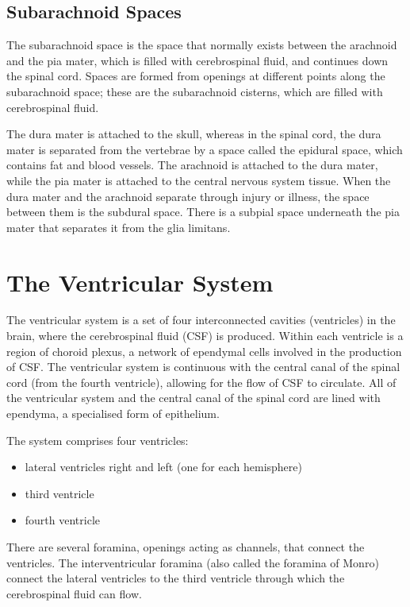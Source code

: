 \hypertarget{subarachnoid-spaces}{%
\subsection{Subarachnoid Spaces}\label{subarachnoid-spaces}}

The subarachnoid space is the space that normally exists between the arachnoid and the pia mater, which is filled with cerebrospinal fluid, and continues down the spinal cord. Spaces are formed from openings at different points along the subarachnoid space; these are the subarachnoid cisterns, which are filled with cerebrospinal fluid.

The dura mater is attached to the skull, whereas in the spinal cord, the dura mater is separated from the vertebrae by a space called the epidural space, which contains fat and blood vessels. The arachnoid is attached to the dura mater, while the pia mater is attached to the central nervous system tissue. When the dura mater and the arachnoid separate through injury or illness, the space between them is the subdural space. There is a subpial space underneath the pia mater that separates it from the glia limitans.

\hypertarget{the-ventricular-system}{%
\section{The Ventricular System}\label{the-ventricular-system}}

The ventricular system is a set of four interconnected cavities (ventricles) in the brain, where the cerebrospinal fluid (CSF) is produced. Within each ventricle is a region of choroid plexus, a network of ependymal cells involved in the production of CSF. The ventricular system is continuous with the central canal of the spinal cord (from the fourth ventricle), allowing for the flow of CSF to circulate. All of the ventricular system and the central canal of the spinal cord are lined with ependyma, a specialised form of epithelium.

The system comprises four ventricles:

\begin{itemize}
\tightlist
\item
  lateral ventricles right and left (one for each hemisphere)
\item
  third ventricle
\item
  fourth ventricle
\end{itemize}

There are several foramina, openings acting as channels, that connect the ventricles. The interventricular foramina (also called the foramina of Monro) connect the lateral ventricles to the third ventricle through which the cerebrospinal fluid can flow.

